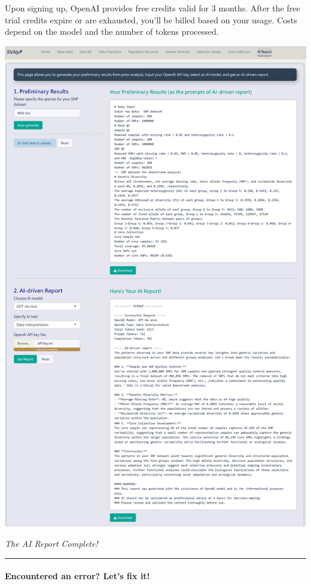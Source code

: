 \documentclass[
]{book}
\begin{document}
Upon signing up, OpenAI provides free credits valid for 3 months. After the free trial credits expire or are exhausted, you'll be billed based on your usage. Costs depend on the model and the number of tokens processed.

\includegraphics{images/clipboard-420815584.png}

\emph{The AI Report Complete!}

\begin{center}\rule{0.5\linewidth}{0.5pt}\end{center}

\paragraph*{Encountered an error? Let's fix it!}\label{encountered-an-error-lets-fix-it}
\end{document}
